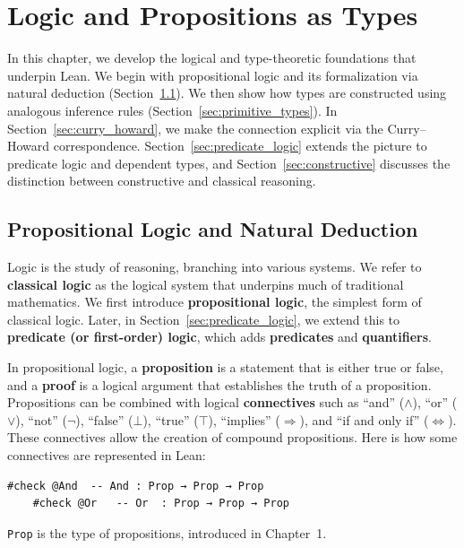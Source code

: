 \chapter{Logic and Propositions as Types}

In this chapter, we develop the logical and type-theoretic foundations
that underpin Lean.
We begin with propositional logic and its formalization via natural
deduction (Section~\ref{sec:prop_logic}).
We then show how types are constructed using analogous inference rules
(Section~\ref{sec:primitive_types}).
In Section~\ref{sec:curry_howard}, we make the connection explicit
via the Curry--Howard correspondence.
Section~\ref{sec:predicate_logic} extends the picture to predicate
logic and dependent types, and Section~\ref{sec:constructive} discusses
the distinction between constructive and classical reasoning.

\section{Propositional Logic and Natural Deduction}\label{sec:prop_logic}

Logic is the study of reasoning, branching into various systems.
We refer to \textbf{classical logic} as the logical system that
underpins much of traditional mathematics.
We first introduce \textbf{propositional logic}, the simplest form of
classical logic.
Later, in Section~\ref{sec:predicate_logic}, we extend this to
\textbf{predicate (or first-order) logic}, which adds
\textbf{predicates} and \textbf{quantifiers}.

In propositional logic, a \textbf{proposition} is a statement that is
either true or false, and a \textbf{proof} is a logical argument that
establishes the truth of a proposition.
Propositions can be combined with logical \textbf{connectives} such as
``and'' ($\wedge$),
``or'' ($\vee$),
``not'' ($\neg$),
``false'' ($\bot$),
``true'' ($\top$),
``implies'' ($\Rightarrow$),
and ``if and only if'' ($\Leftrightarrow$).
These connectives allow the creation of compound propositions.
Here is how some connectives are represented in Lean:

\begin{example}\mbox{}
  \begin{lstlisting}[language=lean]
    #check @And  -- And : Prop → Prop → Prop
    #check @Or   -- Or  : Prop → Prop → Prop
  \end{lstlisting}
  \lstinline[language=lean]|Prop| is the type of propositions,
  introduced in Chapter~1.
\end{example}

